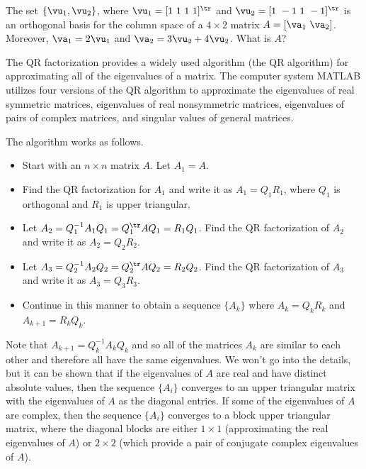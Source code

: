 \begin{activity} The set $\{\vu_1, \vu_2\}$, where $\vu_1 =  [1 \ 1 \ 1 \ 1]^{\tr}$ and $\vu_2 = [1 \ -1 \ 1 \ -1]^{\tr}$ is an orthogonal basis for the column space of a $4 \times 2$ matrix $A = [\va_1 \ \va_2]$. Moreover, $\va_1 = 2\vu_1$ and $\va_2 = 3\vu_2+4\vu_2$. What is $A$? 
\end{activity}


The QR factorization provides a widely used algorithm (the QR algorithm) for approximating all of the eigenvalues of a matrix. The computer system MATLAB utilizes four versions of the QR algorithm to approximate the eigenvalues of real symmetric matrices, eigenvalues of real nonsymmetric matrices, eigenvalues of pairs of complex matrices, and singular values of general matrices. %

The algorithm works as follows.
\begin{itemize}
\item Start with an $n \times n$ matrix $A$. Let $A_1 = A$.
\item Find the QR factorization for $A_1$ and write it as $A_1 = Q_1R_1$, where $Q_1$ is orthogonal and $R_1$ is upper triangular.
\item Let $A_2 = Q_1^{-1}A_1Q_1 = Q_1^{\tr}AQ_1 = R_1Q_1$. Find the QR factorization of $A_2$ and write it as $A_2 = Q_2R_2$.
\item Let $A_3 = Q_2^{-1}A_2Q_2 = Q_2^{\tr}AQ_2 = R_2Q_2$. Find the QR factorization of $A_3$ and write it as $A_3 = Q_3R_3$.
\item Continue in this manner to obtain a sequence $\{A_k\}$ where $A_k = Q_kR_k$ and $A_{k+1} = R_kQ_k$.
\end{itemize}
Note that $A_{k+1} = Q_k^{-1}A_kQ_k$ and so all of the matrices $A_k$ are similar to each other and therefore all have the same eigenvalues. We won't go into the details, but it can be shown that if the eigenvalues of $A$ are real and have distinct absolute values, then the sequence $\{A_i\}$ converges to an upper triangular matrix with the eigenvalues of $A$ as the diagonal entries. If some of the eigenvalues of $A$ are complex, then the sequence $\{A_i\}$ converges to a block upper triangular matrix, where the diagonal blocks are either $1 \times 1$ (approximating the real eigenvalues of $A$) or $2 \times 2$ (which provide a pair of conjugate complex eigenvalues of $A$).

\label{sec:gram_schmidt_examples}

